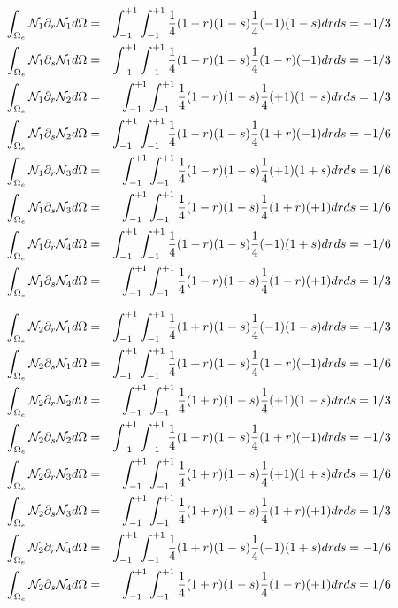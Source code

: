 \begin{tiny}

\begin{eqnarray}
\int_{\Omega_e}{\mathcal{N}}_1\partial_r {\mathcal{N}}_1 d\Omega&=&\int_{-1}^{+1}\int_{-1}^{+1} \frac{1}{4}(1-r)(1-s) \frac{1}{4}(-1)(1-s) dr ds = -1/3 \nonumber\\
\int_{\Omega_e}{\mathcal{N}}_1\partial_s {\mathcal{N}}_1 d\Omega&=&\int_{-1}^{+1}\int_{-1}^{+1} \frac{1}{4}(1-r)(1-s) \frac{1}{4}(1-r)(-1) dr ds = -1/3 \nonumber\\
\int_{\Omega_e}{\mathcal{N}}_1\partial_r {\mathcal{N}}_2 d\Omega&=&\int_{-1}^{+1}\int_{-1}^{+1} \frac{1}{4}(1-r)(1-s) \frac{1}{4}(+1)(1-s) dr ds = 1/3 \nonumber\\
\int_{\Omega_e}{\mathcal{N}}_1\partial_s {\mathcal{N}}_2 d\Omega&=&\int_{-1}^{+1}\int_{-1}^{+1} \frac{1}{4}(1-r)(1-s) \frac{1}{4}(1+r)(-1) dr ds = -1/6 \nonumber\\
\int_{\Omega_e}{\mathcal{N}}_1\partial_r {\mathcal{N}}_3 d\Omega&=&\int_{-1}^{+1}\int_{-1}^{+1} \frac{1}{4}(1-r)(1-s) \frac{1}{4}(+1)(1+s) dr ds = 1/6 \nonumber\\
\int_{\Omega_e}{\mathcal{N}}_1\partial_s {\mathcal{N}}_3 d\Omega&=&\int_{-1}^{+1}\int_{-1}^{+1} \frac{1}{4}(1-r)(1-s) \frac{1}{4}(1+r)(+1) dr ds = 1/6 \nonumber\\
\int_{\Omega_e}{\mathcal{N}}_1\partial_r {\mathcal{N}}_4 d\Omega&=&\int_{-1}^{+1}\int_{-1}^{+1} \frac{1}{4}(1-r)(1-s) \frac{1}{4}(-1)(1+s) dr ds = -1/6 \nonumber\\
\int_{\Omega_e}{\mathcal{N}}_1\partial_s {\mathcal{N}}_4 d\Omega&=&\int_{-1}^{+1}\int_{-1}^{+1} \frac{1}{4}(1-r)(1-s) \frac{1}{4}(1-r)(+1) dr ds = 1/3 \nonumber
\end{eqnarray}

\begin{eqnarray}
\int_{\Omega_e}{\mathcal{N}}_2\partial_r {\mathcal{N}}_1 d\Omega&=& \int_{-1}^{+1}\int_{-1}^{+1} \frac{1}{4}(1+r)(1-s) \frac{1}{4}(-1)(1-s) dr ds = -1/3 \nonumber\\
\int_{\Omega_e}{\mathcal{N}}_2\partial_s {\mathcal{N}}_1 d\Omega&=& \int_{-1}^{+1}\int_{-1}^{+1} \frac{1}{4}(1+r)(1-s) \frac{1}{4}(1-r)(-1) dr ds = -1/6 \nonumber\\
\int_{\Omega_e}{\mathcal{N}}_2\partial_r {\mathcal{N}}_2 d\Omega&=& \int_{-1}^{+1}\int_{-1}^{+1} \frac{1}{4}(1+r)(1-s) \frac{1}{4}(+1)(1-s) dr ds = 1/3 \nonumber\\
\int_{\Omega_e}{\mathcal{N}}_2\partial_s {\mathcal{N}}_2 d\Omega&=& \int_{-1}^{+1}\int_{-1}^{+1} \frac{1}{4}(1+r)(1-s) \frac{1}{4}(1+r)(-1) dr ds = -1/3 \nonumber\\
\int_{\Omega_e}{\mathcal{N}}_2\partial_r {\mathcal{N}}_3 d\Omega&=& \int_{-1}^{+1}\int_{-1}^{+1} \frac{1}{4}(1+r)(1-s) \frac{1}{4}(+1)(1+s) dr ds = 1/6 \nonumber\\
\int_{\Omega_e}{\mathcal{N}}_2\partial_s {\mathcal{N}}_3 d\Omega&=& \int_{-1}^{+1}\int_{-1}^{+1} \frac{1}{4}(1+r)(1-s) \frac{1}{4}(1+r)(+1) dr ds = 1/3  \nonumber\\
\int_{\Omega_e}{\mathcal{N}}_2\partial_r {\mathcal{N}}_4 d\Omega&=& \int_{-1}^{+1}\int_{-1}^{+1} \frac{1}{4}(1+r)(1-s) \frac{1}{4}(-1)(1+s) dr ds = -1/6 \nonumber\\
\int_{\Omega_e}{\mathcal{N}}_2\partial_s {\mathcal{N}}_4 d\Omega&=& \int_{-1}^{+1}\int_{-1}^{+1} \frac{1}{4}(1+r)(1-s) \frac{1}{4}(1-r)(+1) dr ds = 1/6 \nonumber
\end{eqnarray}


\end{tiny}
